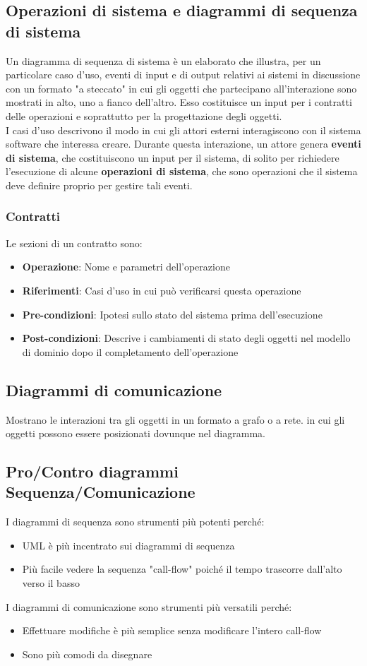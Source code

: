 \documentclass[12pt]{article}
\begin{document}
\subsection{Operazioni di sistema e diagrammi di sequenza di sistema}
Un diagramma di sequenza di sistema è un elaborato che illustra, per un particolare caso d'uso, eventi di input e di output relativi ai sistemi in discussione con un formato "a steccato" in cui gli oggetti che partecipano all'interazione sono mostrati in alto, uno a fianco dell'altro. Esso costituisce un input per i contratti delle operazioni e soprattutto per la progettazione degli oggetti.
\\I casi d'uso descrivono il modo in cui gli attori esterni interagiscono con il sistema software che interessa creare. Durante questa interazione, un attore genera \textbf{eventi di sistema}, che costituiscono un input per il sistema, di solito per richiedere l'esecuzione di alcune \textbf{operazioni di sistema}, che sono operazioni che il sistema deve definire proprio per gestire tali eventi.
\subsubsection{Contratti}
Le sezioni di un contratto sono:
\begin{itemize}
    \item \textbf{Operazione}: Nome e parametri dell'operazione
    \item \textbf{Riferimenti}: Casi d'uso in cui può verificarsi questa operazione
    \item \textbf{Pre-condizioni}: Ipotesi sullo stato del sistema prima dell'esecuzione
    \item \textbf{Post-condizioni}: Descrive i cambiamenti di stato degli oggetti nel modello di dominio dopo il completamento dell'operazione
\end{itemize}
\subsection{Diagrammi di comunicazione}
Mostrano le interazioni tra gli oggetti in un formato a grafo o a rete. in cui gli oggetti possono essere posizionati dovunque nel diagramma.

\subsection{Pro/Contro diagrammi Sequenza/Comunicazione}
I diagrammi di sequenza sono strumenti più potenti perché:
\begin{itemize}
    \item UML è più incentrato sui diagrammi di sequenza
    \item Più facile vedere la sequenza "call-flow" poiché il tempo trascorre dall'alto verso il basso
\end{itemize}
I diagrammi di comunicazione sono strumenti più versatili perché:
\begin{itemize}
    \item Effettuare modifiche è più semplice senza modificare l'intero call-flow
    \item Sono più comodi da disegnare
\end{itemize}
\end{document}
